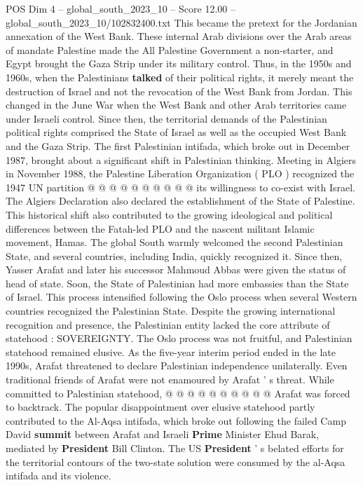\begin{textsample}{POS Dim 4 – global\_south\_2023\_10 – Score 12.00 – global\_south\_2023\_10/102832400.txt}
This became the pretext for the Jordanian annexation of the West Bank.
These internal Arab divisions over the Arab areas of mandate Palestine made the All Palestine Government a non-starter, and Egypt brought the Gaza Strip under its military control.
Thus, in the 1950s and 1960s, when the Palestinians \textbf{talked} of their political rights, it merely meant the destruction of Israel and not the revocation of the West Bank from Jordan.
This changed in the June War when the West Bank and other Arab territories came under Israeli control.
Since then, the territorial demands of the Palestinian political rights comprised the State of Israel as well as the occupied West Bank and the Gaza Strip.
The first Palestinian intifada, which broke out in December 1987, brought about a significant shift in Palestinian thinking.
Meeting in Algiers in November 1988, the Palestine Liberation Organization ( PLO ) recognized the 1947 UN partition @ @ @ @ @ @ @ @ @ @ its willingness to co-exist with Israel.
The Algiers Declaration also declared the establishment of the State of Palestine.
This historical shift also contributed to the growing ideological and political differences between the Fatah-led PLO and the nascent militant Islamic movement, Hamas.
The global South warmly welcomed the second Palestinian State, and several countries, including India, quickly recognized it.
Since then, Yasser Arafat and later his successor Mahmoud Abbas were given the status of head of state.
Soon, the State of Palestinian had more embassies than the State of Israel.
This process intensified following the Oslo process when several Western countries recognized the Palestinian State.
Despite the growing international recognition and presence, the Palestinian entity lacked the core attribute of statehood : SOVEREIGNTY.
The Oslo process was not fruitful, and Palestinian statehood remained elusive.
As the five-year interim period ended in the late 1990s, Arafat threatened to declare Palestinian independence unilaterally.
Even traditional friends of Arafat were not enamoured by Arafat ' s threat.
While committed to Palestinian statehood, @ @ @ @ @ @ @ @ @ @ Arafat was forced to backtrack.
The popular disappointment over elusive statehood partly contributed to the Al-Aqsa intifada, which broke out following the failed Camp David \textbf{summit} between Arafat and Israeli \textbf{Prime} Minister Ehud Barak, mediated by \textbf{President} Bill Clinton.
The US \textbf{President} ' s belated efforts for the territorial contours of the two-state solution were consumed by the al-Aqsa intifada and its violence.

\end{textsample}
